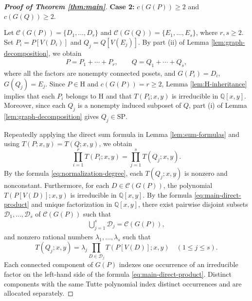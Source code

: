 \documentclass[11pt,a4paper]{article}
\begin{document}
\begin{proof}[\rm\textbf{Proof of Theorem \ref{thm:main}}]
\textbf{Case 2:} $c(G(P))\geq2$ and $c(G(Q))\geq2$.

Let $\mathcal C(G(P))=\{D_1,\ldots,D_r\}$ and $\mathcal C(G(Q))=\{E_1,\ldots,E_s\}$, where $r,s\geq2$.
Set $P_i=P[V(D_i)]$ and $Q_j=Q[V(E_j)]$.
By part \textup{(ii)} of Lemma \ref{lem:graph-decomposition}, we obtain
\begin{eqnarray*}
P=P_1+\cdots+P_r,\qquad Q=Q_1+\cdots+Q_s,
\end{eqnarray*}
where all the factors are nonempty connected posets,
and $G(P_i)=D_i$, $G(Q_j)=E_j$.
Since $P\in\mathrm H$ and $c(G(P))=r\geq2$,
Lemma \ref{lem:H-inheritance} implies that each $P_i$ belongs to $\mathrm H$ and that $T(P_i;x,y)$
is irreducible in $\mathbb Q[x,y]$.
Moreover, since each $Q_j$ is a nonempty induced subposet of $Q$,
part \textup{(i)} of Lemma \ref{lem:graph-decomposition} gives $Q_j\in\mathrm{SP}$.

Repeatedly applying the direct sum formula in Lemma \ref{lem:sum-formulas}
and using $T(P;x,y)=T(Q;x,y)$, we obtain
\begin{equation}\label{eq:main-direct-product}
\prod_{i=1}^{r}T(P_i;x,y)=\prod_{j=1}^{s}T(Q_j;x,y).
\end{equation}
By the formula \eqref{eq:normalization-degree}, each $T(Q_j;x,y)$ is nonzero and nonconstant.
Furthermore, for each $D\in\mathcal C(G(P))$, the polynomial $T(P[V(D)];x,y)$ is irreducible in $\mathbb Q[x,y]$.
By the formula \eqref{eq:main-direct-product} and unique factorization in $\mathbb Q[x,y]$, there exist pairwise disjoint subsets
$\mathcal D_1,\ldots,\mathcal D_s$ of $\mathcal C(G(P))$ such that
\begin{eqnarray*}
\bigcup_{j=1}^{s}\mathcal D_j=\mathcal C(G(P)),
\end{eqnarray*}
and nonzero rational numbers $\lambda_1,\ldots,\lambda_s$ such that
\begin{equation}\label{eq:main-factor-allocation}
T(Q_j;x,y)=\lambda_j\prod_{D\in\mathcal D_j}T(P[V(D)];x,y)\quad(1\leq j\leq s).
\end{equation}
Each connected component of $G(P)$ indexes one occurrence
of an irreducible factor on the left-hand side of the formula \eqref{eq:main-direct-product}.
Distinct components with the same Tutte polynomial index distinct occurrences and are allocated separately.


\end{proof}
\end{document}
